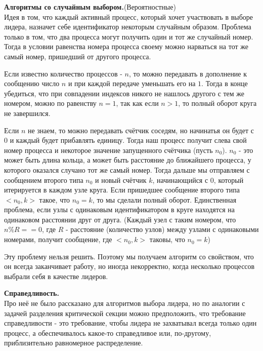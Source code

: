 \textbf{Алгоритмы со случайным выбором.}(Вероятностные)\\
Идея в том, что каждый активный процесс, который хочет участвовать в выборе лидера, назначет себе идентификатор некоторым случайным образом.
Проблема только в том, что два процесса могут получить один и тот же случайный номер. Тогда в условии равенства номера процесса своему можно нарваться на тот же самый номер, пришедший от другого процесса.

Если известно количество  процессов - $n$, то можно передавать в дополнение к сообщению число $n$ и при каждой передаче уменьшать его на $1$. Тогда в конце убедиться, что при совпадении индексов никого не нашлось другого с тем же номером, можно по равенству $n = 1$, так как если $n > 1$, то полный оборот круга не завершился.

Если $n$ не знаем, то можно передавать счётчик соседям, но начинатья он будет с $0$ и каждый будет прибавлять единицу. Тогда наш процесс получит слева свой номер процесса и некоторое значение запущенного счётчика (пусть $n_0$). $n_0$ - это может быть длина кольца, а может быть расстояние до ближайшего процесса, у которого оказался случано тот же самый номер. Тогда дальше мы отправляем с сообщением второго типа $n_0$ и новый счётчик $k$, начинающийся с $0$, который итерируется в каждом узле круга. Если пришедшее сообщение второго типа $<n_0, k>$ такое, что $n_0 = k$, то мы сделали полный оборот. Единственная проблема, если узлы с одинаковым идентификатором в круге находятся на одинаковом расстоянии друг от друга. (Каждый узел с таким номером, что $n \% R == 0$, где $R$ - расстояние (количество узлов) между узлами с одинаковыми номерами, получит  сообщение, где $<n_0, k>$ таковы, что $n_0 = k$)

Эту проблему нельзя решить. Поэтому мы получаем алгоритм со свойством, что он всегда заканчивает работу, но иногда некорректно, когда несколько процессов выбрали себя в качестве лидеров.

\textbf{Справедливость.}\\
Про неё не было рассказано для алгоритмов выбора лидера, но по аналогии с задачей разделения критической секции можно предположить, что требование справедливости - это требование, чтобы лидера не захватывал всегда только один процесс, а обеспечивалось какое-то справедливое или, по-другому, приблизительно равномерное распределение.
